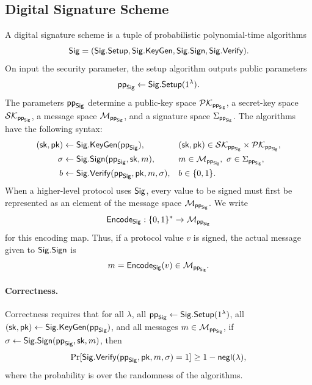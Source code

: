 \subsection{Digital Signature Scheme}
\begin{definition}
A digital signature scheme is a tuple of probabilistic polynomial-time algorithms
\begin{equation*}
  \Sig=(\Sig.\Setup,\Sig.\KeyGen,\Sig.\Sign,\Sig.\Verify).
\end{equation*}
On input the security parameter, the setup algorithm outputs public parameters
\begin{equation*}
  \ppSig\leftarrow\Sig.\Setup(1^\lambda).
\end{equation*}
The parameters $\ppSig$ determine a public-key space $\PKSig$, a secret-key space $\SKSig$, a message space $\MSig$, and a signature space $\SigmaSig$. The algorithms have the following syntax:
\begin{equation*}
\begin{aligned}
  (\sk,\pk) &\leftarrow \Sig.\KeyGen(\ppSig),
  &&(\sk,\pk)\in\SKSig\times\PKSig,\\
  \sigma &\leftarrow \Sig.\Sign(\ppSig,\sk,m),
  &&m\in\MSig,\ \sigma\in\SigmaSig,\\
  b &\leftarrow \Sig.\Verify(\ppSig,\pk,m,\sigma),
  &&b\in\{0,1\}.
\end{aligned}
\end{equation*}
When a higher-level protocol uses $\Sig$, every value to be signed must first be represented as an element of the message space $\MSig$. We write
\begin{equation*}
  \EncodeSig:\{0,1\}^{\ast}\to\MSig
\end{equation*}
for this encoding map. Thus, if a protocol value $v$ is signed, the actual message given to $\Sig.\Sign$ is
\begin{equation*}
  m=\EncodeSig(v)\in\MSig.
\end{equation*}

\paragraph{Correctness.}
Correctness requires that for all $\lambda$, all $\ppSig\leftarrow\Sig.\Setup(1^\lambda)$, all $(\sk,\pk)\leftarrow\Sig.\KeyGen(\ppSig)$, and all messages $m\in\MSig$, if $\sigma\leftarrow\Sig.\Sign(\ppSig,\sk,m)$, then
\begin{equation*}
  \Pr[\Sig.\Verify(\ppSig,\pk,m,\sigma)=1]\geq 1-\negl(\lambda),
\end{equation*}
where the probability is over the randomness of the algorithms.


\end{definition}
